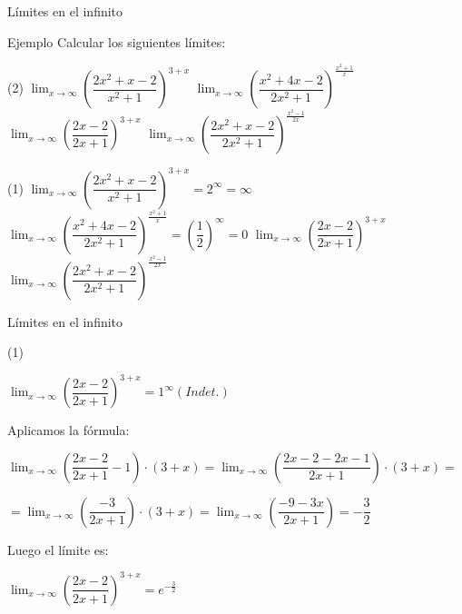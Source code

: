\documentclass[8pt]{beamer}
\newcommand{\limite}[2]{\displaystyle \lim_{x \rightarrow #1}{#2}}
\begin{document}
\begin{frame}{Límites en el infinito}
\begin{exampleblock}{Ejemplo}
Calcular los siguientes límites:
\begin{tasks}[label=\alph*)](2)
\task $\limite{\infty}{\left( \dfrac{2x^2+x-2}{x^2+1}\right)^{3+x}}$
\task $\limite{\infty}{\left( \dfrac{x^2+4x-2}{2x^2+1}\right)^{\frac{x^2+1}{x}}}$
\task $\limite{\infty}{\left( \dfrac{2x-2}{2x+1}\right)^{3+x}}$
\task $\limite{\infty}{\left( \dfrac{2x^2+x-2}{2x^2+1}\right)^{\frac{x^2-1}{2x}}}$
\end{tasks}
\end{exampleblock}

\begin{tasks}[label=\alph*)](1)
\task $\limite{\infty}{\left( \dfrac{2x^2+x-2}{x^2+1}\right)^{3+x}}=2^{\infty}=\infty$
\task $\limite{\infty}{\left( \dfrac{x^2+4x-2}{2x^2+1}\right)^{\frac{x^2+1}{x}}}=\left( \dfrac{1}{2}\right)^{\infty}=0$
\task $\limite{\infty}{\left( \dfrac{2x-2}{2x+1}\right)^{3+x}}$
\task $\limite{\infty}{\left( \dfrac{2x^2+x-2}{2x^2+1}\right)^{\frac{x^2-1}{2x}}}$
\end{tasks}
\end{frame}

\begin{frame}{Límites en el infinito}

\begin{tasks}[label=\alph*),resume](1)

\task $\limite{\infty}{\left( \dfrac{2x-2}{2x+1}\right)^{3+x}}=1^{\infty} (Indet.)$

\vspace{10pt}

Aplicamos la fórmula:

\vspace{10pt}

$\limite{\infty}{\left( \dfrac{2x-2}{2x+1}-1\right)\cdot(3+x)}= 
\limite{\infty}{\left( \dfrac{2x-2-2x-1}{2x+1}\right)\cdot(3+x)}= $

\vspace{10pt}

$= \limite{\infty}{\left( \dfrac{-3}{2x+1}\right)\cdot(3+x)}=
\limite{\infty}{\left( \dfrac{-9-3x}{2x+1}\right)}= -\dfrac{3}{2}$

\vspace{10pt}

Luego el límite es: 

\vspace{10pt}
$\limite{\infty}{\left( \dfrac{2x-2}{2x+1}\right)^{3+x}}= e^{-\frac{3}{2}}$


\end{tasks}
\end{frame}
\end{document}
